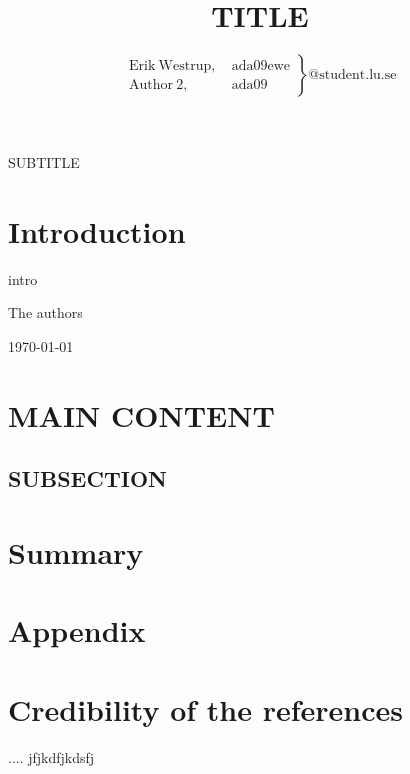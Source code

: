 \documentclass[10pt,journal,compsoc,final,twoside,twocolumn,a4paper]{IEEEtran}
\begin{document}
\title{TITLE}

\author{
\begin{math}
\left. \begin{array}{ll} 
	\mathrm{Erik~Westrup,} & \mathrm{~ada09ewe} \\
	\mathrm{Author~2,} & \mathrm{~ada09}
\end{array} \right\}\mathrm{@student.lu.se}
\end{math}
}

{SUBTITLE}

\maketitle
\IEEEdisplaynotcompsoctitleabstractindextext
\IEEEpeerreviewmaketitle

\section{Introduction}

 intro


\hfill The authors

\hfill \today


\section{MAIN CONTENT}
\lipsum[1-2]

\subsection{SUBSECTION}
\lipsum[1]

\section{Summary}




\newpage
\section*{Appendix}
\appendices
\section{Credibility of the references}

\emph{\cite{dummy:ref}} .... jfjkdfjkdsfj
\end{document}
